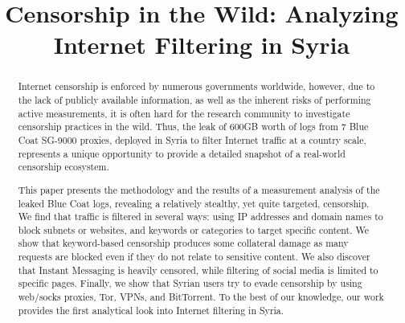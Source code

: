\documentclass{sig-alternate-2013}
\begin{document}
\title{Censorship in the Wild:\hspace{-0.1cm} Analyzing Internet Filtering in Syria}

\author{
\and
{}
}




\maketitle

\begin{abstract}
Internet censorship is enforced by numerous governments worldwide, however, due to the lack of publicly available information, as well as the inherent risks of performing active measurements, it is often hard for the research community to investigate censorship practices in the wild. Thus, the leak of 600GB worth of logs from 7 Blue Coat SG-9000 proxies, deployed in Syria to filter Internet traffic at a country scale, represents a unique opportunity to provide a detailed snapshot of a real-world censorship ecosystem. 

This paper presents the methodology and the results of a measurement analysis of the leaked Blue Coat logs, revealing a relatively stealthy, yet quite targeted, censorship. We find that traffic is filtered in several ways: using IP addresses and domain names to block subnets or websites, and keywords or categories to target specific content. We show that keyword-based censorship produces some collateral damage as many requests are blocked even if they do not relate to sensitive content.  We also discover that Instant Messaging is heavily censored, while filtering of social media is limited to specific pages. Finally, we show that Syrian users try to evade censorship by using web/socks proxies, Tor, VPNs, and BitTorrent. To the best of our knowledge, our work provides the first analytical look into Internet filtering in Syria.
\end{abstract}
\end{document}
